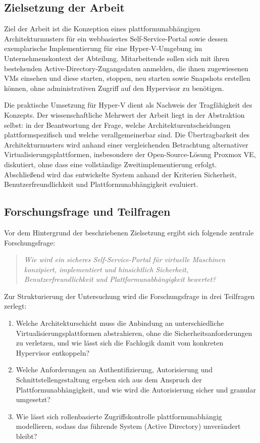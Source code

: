 \documentclass[12pt,a4paper]{article}
\begin{document}
\subsection{Zielsetzung der Arbeit}

Ziel der Arbeit ist die Konzeption eines plattformunabhängigen Architekturmusters für ein webbasiertes Self-Service-Portal sowie dessen exemplarische Implementierung für eine Hyper-V-Umgebung im Unternehmenskontext der Abteilung. Mitarbeitende sollen sich mit ihren bestehenden Active-Directory-Zugangsdaten anmelden, die ihnen zugewiesenen VMs einsehen und diese starten, stoppen, neu starten sowie Snapshots erstellen können, ohne administrativen Zugriff auf den Hypervisor zu benötigen.

Die praktische Umsetzung für Hyper-V dient als Nachweis der Tragfähigkeit des Konzepts. Der wissenschaftliche Mehrwert der Arbeit liegt in der Abstraktion selbst: in der Beantwortung der Frage, welche Architekturentscheidungen plattformspezifisch und welche verallgemeinerbar sind. Die Übertragbarkeit des Architekturmusters wird anhand einer vergleichenden Betrachtung alternativer Virtualisierungsplattformen, insbesondere der Open-Source-Lösung Proxmox VE, diskutiert, ohne dass eine vollständige Zweitimplementierung erfolgt. Abschließend wird das entwickelte System anhand der Kriterien Sicherheit, Benutzerfreundlichkeit und Plattformunabhängigkeit evaluiert.

\subsection{Forschungsfrage und Teilfragen}
\label{sec:forschungsfrage}

Vor dem Hintergrund der beschriebenen Zielsetzung ergibt sich folgende zentrale Forschungsfrage:

\begin{quote}
\textit{Wie wird ein sicheres Self-Service-Portal für virtuelle Maschinen konzipiert, implementiert und hinsichtlich Sicherheit, Benutzerfreundlichkeit und Plattformunabhängigkeit bewertet?}
\end{quote}

Zur Strukturierung der Untersuchung wird die Forschungsfrage in drei Teilfragen zerlegt:

\begin{enumerate}
  \item Welche Architekturschicht muss die Anbindung an unterschiedliche Virtualisierungsplattformen abstrahieren, ohne die Sicherheitsanforderungen zu verletzen, und wie lässt sich die Fachlogik damit vom konkreten Hypervisor entkoppeln?
  \item Welche Anforderungen an Authentifizierung, Autorisierung und Schnittstellengestaltung ergeben sich aus dem Anspruch der Plattformunabhängigkeit, und wie wird die Autorisierung sicher und granular umgesetzt?
  \item Wie lässt sich rollenbasierte Zugriffskontrolle plattformunabhängig modellieren, sodass das führende System (Active Directory) unverändert bleibt?
\end{enumerate}
\end{document}
